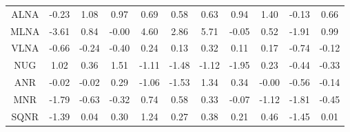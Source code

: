 \begin{longtable}{ | c || c | c | c | c | c | c | c | c | c || c |}
ALNA &  \cellcolor[HTML]{FFF7F7} -0.23 &  \cellcolor[HTML]{E7E7FF} 1.08 &  \cellcolor[HTML]{E7E7FF} 0.97 &  \cellcolor[HTML]{EFEFFF} 0.69 &  \cellcolor[HTML]{EFEFFF} 0.58 &  \cellcolor[HTML]{EFEFFF} 0.63 &  \cellcolor[HTML]{E7E7FF} 0.94 &  \cellcolor[HTML]{DFDFFF} 1.40 &  \cellcolor[HTML]{FFFFFF} -0.13 &  \cellcolor[HTML]{EFEFFF} 0.66 \\
MLNA &  \cellcolor[HTML]{FFA7A7} -3.61 &  \cellcolor[HTML]{E7E7FF} 0.84 &  \cellcolor[HTML]{FFFFFF} -0.00 &  \cellcolor[HTML]{8F8FFF} 4.60 &  \cellcolor[HTML]{B7B7FF} 2.86 &  \cellcolor[HTML]{7070FF} 5.71 &  \cellcolor[HTML]{FFFFFF} -0.05 &  \cellcolor[HTML]{EFEFFF} 0.52 &  \cellcolor[HTML]{FFCFCF} -1.91 &  \cellcolor[HTML]{E7E7FF} 0.99 \\
VLNA &  \cellcolor[HTML]{FFEFEF} -0.66 &  \cellcolor[HTML]{FFF7F7} -0.24 &  \cellcolor[HTML]{FFF7F7} -0.40 &  \cellcolor[HTML]{F7F7FF} 0.24 &  \cellcolor[HTML]{FFFFFF} 0.13 &  \cellcolor[HTML]{F7F7FF} 0.32 &  \cellcolor[HTML]{FFFFFF} 0.11 &  \cellcolor[HTML]{F7F7FF} 0.17 &  \cellcolor[HTML]{FFEFEF} -0.74 &  \cellcolor[HTML]{FFFFFF} -0.12 \\
NUG &  \cellcolor[HTML]{E7E7FF} 1.02 &  \cellcolor[HTML]{F7F7FF} 0.36 &  \cellcolor[HTML]{D7D7FF} 1.51 &  \cellcolor[HTML]{FFDFDF} -1.11 &  \cellcolor[HTML]{FFD7D7} -1.48 &  \cellcolor[HTML]{FFDFDF} -1.12 &  \cellcolor[HTML]{FFCFCF} -1.95 &  \cellcolor[HTML]{F7F7FF} 0.23 &  \cellcolor[HTML]{FFF7F7} -0.44 &  \cellcolor[HTML]{FFF7F7} -0.33 \\
ANR &  \cellcolor[HTML]{FFFFFF} -0.02 &  \cellcolor[HTML]{FFFFFF} -0.02 &  \cellcolor[HTML]{F7F7FF} 0.29 &  \cellcolor[HTML]{FFE7E7} -1.06 &  \cellcolor[HTML]{FFD7D7} -1.53 &  \cellcolor[HTML]{DFDFFF} 1.34 &  \cellcolor[HTML]{F7F7FF} 0.34 &  \cellcolor[HTML]{FFFFFF} -0.00 &  \cellcolor[HTML]{FFEFEF} -0.56 &  \cellcolor[HTML]{FFFFFF} -0.14 \\
MNR &  \cellcolor[HTML]{FFCFCF} -1.79 &  \cellcolor[HTML]{FFEFEF} -0.63 &  \cellcolor[HTML]{FFF7F7} -0.32 &  \cellcolor[HTML]{EFEFFF} 0.74 &  \cellcolor[HTML]{EFEFFF} 0.58 &  \cellcolor[HTML]{F7F7FF} 0.33 &  \cellcolor[HTML]{FFFFFF} -0.07 &  \cellcolor[HTML]{FFDFDF} -1.12 &  \cellcolor[HTML]{FFCFCF} -1.81 &  \cellcolor[HTML]{FFF7F7} -0.45 \\
SQNR &  \cellcolor[HTML]{FFDFDF} -1.39 &  \cellcolor[HTML]{FFFFFF} 0.04 &  \cellcolor[HTML]{F7F7FF} 0.30 &  \cellcolor[HTML]{DFDFFF} 1.24 &  \cellcolor[HTML]{F7F7FF} 0.27 &  \cellcolor[HTML]{F7F7FF} 0.38 &  \cellcolor[HTML]{F7F7FF} 0.21 &  \cellcolor[HTML]{F7F7FF} 0.46 &  \cellcolor[HTML]{FFD7D7} -1.45 &  \cellcolor[HTML]{FFFFFF} 0.01 \\

\end{longtable}
